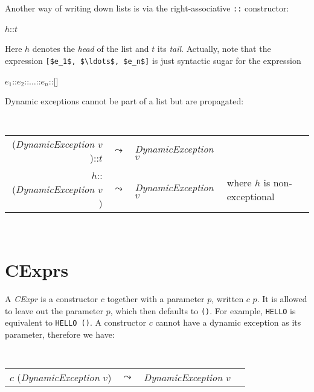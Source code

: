 \documentclass[11pt]{amsart}
\newcommand{\metababel}[1] {\textsl{#1}}
\newenvironment{babelcode}[0]{\begin{center}\tt}{\end{center}}
\newcommand{\babelsrc}[1] {\lstinline!#1!}
\begin{document}
Another way of writing down lists is via the right-associative \babelsrc{::} constructor:
\begin{babellisting}
$h$::$t$
\end{babellisting}
Here $h$ denotes the \emph{head} of the list and $t$ its \emph{tail}. Actually, note that the expression \babelsrc{[$e_1$, $\ldots$, $e_n$]} is just syntactic sugar for the expression
\begin{babellisting}
$e_1$::$e_2$::$\ldots$::$e_n$::[]
\end{babellisting}
Dynamic exceptions cannot be part of a list but are propagated:
\begin{babelcode}
\begin{tabular}{rcll}
(\metababel{DynamicException $v$})::$t$ & $\leadsto$ & \metababel{DynamicException $v$}&\\
$h$::(\metababel{DynamicException $v$}) & $\leadsto$ & \metababel{DynamicException $v$}& {\rm where $h$ is non-exceptional}\\
\end{tabular}\\
\end{babelcode}

\section{CExprs}
A \metababel{CExpr} is a constructor $c$ together with a parameter $p$, written $c$ $p$. It is allowed to leave out the parameter $p$, which then defaults to \babelsrc{()}. For example,  \babelsrc{HELLO} is equivalent to \babelsrc{HELLO ()}. A constructor $c$ cannot have a dynamic exception as its parameter, therefore we have:
\begin{babelcode}
\begin{tabular}{rcll}
$c$ (\metababel{DynamicException $v$}) & $\leadsto$ & \metababel{DynamicException $v$}&\\
\end{tabular}\\
\end{babelcode}
\end{document}
